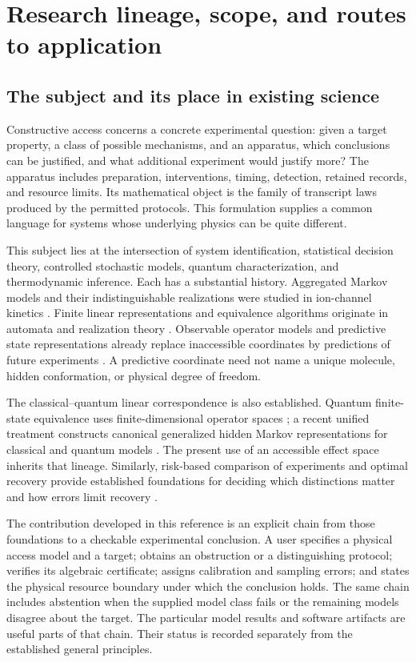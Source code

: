 \chapter{Research lineage, scope, and routes to application}
\label{researchmap:chapter}

\section{The subject and its place in existing science}

Constructive access concerns a concrete experimental question: given a target
property, a class of possible mechanisms, and an apparatus, which conclusions
can be justified, and what additional experiment would justify more?
The apparatus includes preparation, interventions, timing, detection, retained
records, and resource limits. Its mathematical object is the family of
transcript laws produced by the permitted protocols. This formulation supplies
a common language for systems whose underlying physics can be quite different.

This subject lies at the intersection of system identification, statistical
decision theory, controlled stochastic models, quantum characterization, and
thermodynamic inference. Each has a substantial history. Aggregated Markov
models and their indistinguishable realizations were studied in ion-channel
kinetics \cite{p_kienker,p_larget}. Finite linear representations and equivalence
algorithms originate in automata and realization theory
\cite{f_tzeng,f_kiefer,f_thon}. Observable operator models and predictive state
representations already replace inaccessible coordinates by predictions of
future experiments \cite{f_jaeger,f_littman}. A predictive coordinate need not
name a unique molecule, hidden conformation, or physical degree of freedom.

The classical--quantum linear correspondence is also established. Quantum
finite-state equivalence uses finite-dimensional operator spaces
\cite{f_wang,p_faigle}; a recent unified treatment constructs canonical
generalized hidden Markov representations for classical and quantum models
\cite{p_riechers}. The present use of an accessible effect space inherits that
lineage. Similarly, risk-based comparison of experiments and optimal recovery
provide established foundations for deciding which distinctions matter and
how errors limit recovery \cite{f_blackwell,p_donoho}.

The contribution developed in this reference is an explicit chain from those
foundations to a checkable experimental conclusion. A user specifies a
physical access model and a target; obtains an obstruction or a distinguishing
protocol; verifies its algebraic certificate; assigns calibration and sampling
errors; and states the physical resource boundary under which the conclusion
holds. The same chain includes abstention when the supplied model class fails
or the remaining models disagree about the target. The particular model
results and software artifacts are useful parts of that chain. Their status
is recorded separately from the established general principles.

